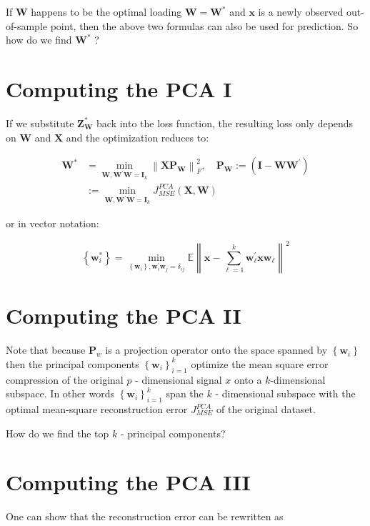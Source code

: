 \documentclass[11pt]{article}
\theoremstyle{plain} %
\theoremstyle{remark}
\begin{document}
If $\mathbf{W}$ happens to be the optimal loading $\mathbf{W}=\mathbf{W}^{*}$ and $\mathbf{x}$ is a newly observed out-of-sample point, then the above two formulas can also be used for prediction. So how do we find $\mathbf{W}^{*}$ ?

\section*{Computing the PCA I}
If we substitute $\mathbf{Z}_{\mathbf{W}}^{*}$ back into the loss function, the resulting loss only depends on $\mathbf{W}$ and $\mathbf{X}$ and the optimization reduces to:

$$
\begin{aligned}
\mathbf{W}^{*} & =\min _{\mathbf{W}, \mathbf{W}^{\prime} \mathbf{W}=\mathbf{I}_{k}}\left\|\mathbf{X P}_{\mathbf{W}}\right\|_{F}^{2}, \quad \mathbf{P}_{\mathbf{W}}:=\left(\mathbf{I}-\mathbf{W} \mathbf{W}^{\prime}\right) \\
& :=\min _{\mathbf{W}, \mathbf{W}^{\prime} \mathbf{W}=\mathbf{I}_{k}} J_{M S E}^{P C A}(\mathbf{X}, \mathbf{W})
\end{aligned}
$$

or in vector notation:

$$
\left\{\mathbf{w}_{i}^{*}\right\}=\min _{\left\{\mathbf{w}_{i}\right\}, \mathbf{w}_{i}^{\prime} \mathbf{w}_{j}=\delta_{i j}} \mathbb{E}\left\|\mathbf{x}-\sum_{\ell=1}^{k} \mathbf{w}_{\ell}^{\prime} \mathbf{x} \mathbf{w}_{\ell}\right\|^{2}
$$

\section*{Computing the PCA II}
Note that because $\mathbf{P}_{w}$ is a projection operator onto the space spanned by $\left\{\mathbf{w}_{i}\right\}$ then the principal components $\left\{\mathbf{w}_{i}\right\}_{i=1}^{k}$ optimize the mean square error compression of the original $p$ - dimensional signal $x$ onto a $k$-dimensional subspace. In other words $\left\{\mathbf{w}_{i}\right\}_{i=1}^{k}$ span the $k$ - dimensional subspace with the optimal mean-square reconstruction error $J_{M S E}^{P C A}$ of the original dataset.

How do we find the top $k$ - principal components?

\section*{Computing the PCA III}
One can show that the reconstruction error can be rewritten as
\end{document}
